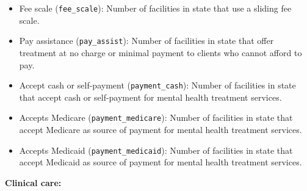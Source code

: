 \documentclass[
]{article}
\providecommand{\tightlist}{%
  \setlength{\itemsep}{0pt}\setlength{\parskip}{0pt}}
\begin{document}
\begin{itemize}
  \begin{itemize}
  \tightlist
  \item
    Fee scale (\texttt{fee\_scale}): Number of facilities in state that use a sliding fee scale.
  \item
    Pay assistance (\texttt{pay\_assist}): Number of facilities in state that offer treatment at no charge or minimal payment to clients who cannot afford to pay.
  \item
    Accept cash or self-payment (\texttt{payment\_cash}): Number of facilities in state that accept cash or self-payment for mental health treatment services.
  \item
    Accepts Medicare (\texttt{payment\_medicare}): Number of facilities in state that accept Medicare as source of payment for mental health treatment services.
  \item
    Accepts Medicaid (\texttt{payment\_medicaid}): Number of facilities in state that accept Medicaid as source of payment for mental health treatment services.
  \end{itemize}
\end{itemize}

\textbf{Clinical care:}
\end{document}
